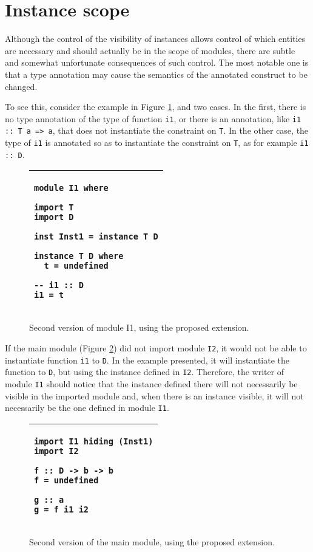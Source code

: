 \documentclass[msc]{ppgccufmg}
\begin{document}
\section{Instance scope}
Although the control of the visibility of instances allows control of
which entities are necessary and should actually be in the scope of
modules, there are subtle and somewhat unfortunate consequences of
such control. The most notable one is that a type annotation may cause
the semantics of the annotated construct to be changed. 

To see this, consider the example in Figure \ref{I1-2}, and two cases.
In the first, there is no type annotation of the type of function
\texttt{i1}, or there is an annotation, like \texttt{i1 :: T a => a},
that does not instantiate the constraint on \texttt{T}.  In the other
case, the type of \texttt{i1} is annotated so as to instantiate the
constraint on \texttt{T}, as for example \texttt{i1 :: D}.

\begin{figure}
\caption{Second version of module I1, using the proposed extension.\label{I1-2}}
\begin{tabular}{|p{\textwidth}|}
\hline
\begin{verbatim}
module I1 where

import T
import D

inst Inst1 = instance T D

instance T D where
  t = undefined

-- i1 :: D
i1 = t
\end{verbatim}
\\
\hline
\end{tabular}
\end{figure}

If the main module (Figure \ref{main-2})
did not import module \texttt{I2}, it would not be able to instantiate function
\texttt{i1} to \texttt{D}.  In the example presented, it will instantiate the
function to \texttt{D}, but using the instance defined in \texttt{I2}.
Therefore, the writer of module \texttt{I1} should notice that the instance
defined there will not necessarily be visible in the imported module and, when
there is an instance visible, it will not necessarily be the one defined in
module \texttt{I1}.

\begin{figure}
\caption{Second version of the main module, using the proposed
  extension.\label{main-2}}
\begin{tabular}{|p{\textwidth}|}
\hline
\begin{verbatim}
import I1 hiding (Inst1)
import I2

f :: D -> b -> b
f = undefined

g :: a
g = f i1 i2
\end{verbatim}
\\
\hline
\end{tabular}
\end{figure}
\end{document}
